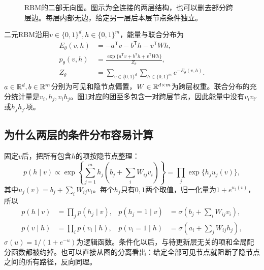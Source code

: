 \begin{figure}[htbp]
\centering
{}
\caption{RBM的二部无向图。图示为全连接的两层结构，也可以删去部分跨层边。每层内部无边，给定另一层后本层节点条件独立。}
\label{fig:bayes-rbm-structure}
\end{figure}

二元RBM沿用$v\in\{0,1\}^d,h\in\{0,1\}^m$，能量与联合分布为
\begin{align}
 E_\theta(v,h)&=-a^{\mathsf T}v-b^{\mathsf T}h-v^{\mathsf T}Wh,\\
 p_\theta(v,h)&=\frac{\exp\{a^{\mathsf T}v+b^{\mathsf T}h+v^{\mathsf T}Wh\}}{Z_\theta},\\
 Z_\theta&=\sum_{v\in\{0,1\}^d}\sum_{h\in\{0,1\}^m}e^{-E_\theta(v,h)}.
 \label{eq:bayes-rbm-joint}
\end{align}
$a\in\mathbb{R}^d,b\in\mathbb{R}^m$分别为可见和隐节点偏置，$W\in\mathbb{R}^{d\times m}$为跨层权重。联合分布的充分统计量是$v_i,h_j,v_ih_j$。图\ref{fig:bayes-rbm-structure}对应的团至多包含一对跨层节点，因此能量中没有$v_iv_{i'}$或$h_jh_{j'}$项。

\subsection{为什么两层的条件分布容易计算}
固定$v$后，把所有包含$h$的项按隐节点整理：
\begin{equation}
 p(h\mid v)\propto\exp\left\{\sum_{j=1}^m h_j
 \left(b_j+\sum_iW_{ij}v_i\right)\right\}
 =\prod_j\exp\{h_j u_j(v)\},
\end{equation}
其中$u_j(v)=b_j+\sum_iW_{ij}v_i$。每个$h_j$只有$0,1$两个取值，归一化量为$1+e^{u_j(v)}$，所以
\begin{align}
 p(h\mid v)&=\prod_jp(h_j\mid v),&
 p(h_j=1\mid v)&=\sigma\left(b_j+\sum_iW_{ij}v_i\right),\\
 p(v\mid h)&=\prod_ip(v_i\mid h),&
 p(v_i=1\mid h)&=\sigma\left(a_i+\sum_jW_{ij}h_j\right),
 \label{eq:bayes-rbm-conditionals}
\end{align}
$\sigma(u)=1/(1+e^{-u})$为逻辑函数。条件化以后，与待更新层无关的项和全局配分函数都被约掉。也可以直接从图的分离看出：给定全部可见节点就阻断了隐节点之间的所有路径，反向同理。

